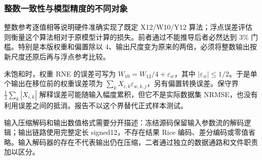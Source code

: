 \subsubsection{整数一致性与模型精度的不同对象}
整数参考逐值相等说明硬件准确实现了既定 X12/W10/Y12 算法；浮点误差评估则衡量这个算法相对于原模型计算的损失。前者通过不能推导后者必然达到 3\% 门槛。特别是本版权重和偏置除以 4、输出尺度变为原来的两倍，必须将整数输出按新尺度还原后再与浮点参考比较。

未饱和时，权重 RNE 的误差可写为 $W_{10}=W_{12}/4+\varepsilon_w$，其中 $|\varepsilon_w|\le1/2$。于是单个输出在移位前的权重误差项为 $\sum_k X_{i,k}\varepsilon_{w,k,j}$，另有偏置转换误差。保守界 $\frac12\sum_k|X_{i,k}|$ 解释误差可能随输入幅度累积，但它不是实际数据集 NRMSE，也没有利用误差之间的抵消。报告不以这个界替代正式样本测试。

输入压缩解码和输出数值格式需要分开描述：冻结源码保留输入参数流的解码逻辑；输出链路使用完整定长 signed12，不存在结果 Rice 编码、差分编码或零值省略。输入解码器的存在不代表输出仍在压缩，二者通过独立的数据通路和文件职责加以区分。
